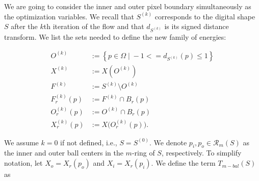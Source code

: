 %
%
%
%
%
%
%



We are going to consider the inner and outer pixel boundary simultaneously as the optimization variables. We recall that $S^{(k)}$ corresponds to the digital shape $S$ after the $k$th iteration of the flow and that $d_{S^{(k)}}$ is its signed distance transform. We list the sets needed to define the new family of energies:

\begin{align*}
	O^{(k)} &:=\left\{ p \in \Omega \; | \; -1 <= d_{S^{(k)}}(p) \leq 1 \right\}\\
	X^{(k)} &:= X(O^{(k)})  \\
	F^{(k)} &:= S^{(k)} \setminus O^{(k)} \\
	F_r^{(k)}(p) &:= F^{(k)} \cap B_r(p)\\
	O_r^{(k)}(p) &:= O^{(k)} \cap B_r(p) \\
	X_r^{(k)}(p) &:= X\big( O_r^{(k)}(p) \big).
\end{align*}

We assume $k=0$ if not defined, i.e., $S=S^{(0)}$. We denote $p_i, p_o \in \mathcal{R}_m(S)$ as the inner and outer ball centers in the $m$-ring of $S$, respectively. To simplify notation, let $X_o=X_r(p_o)$ and $X_i=X_r(p_i)$. We define the term $T_{m-bal}(S)$ as

